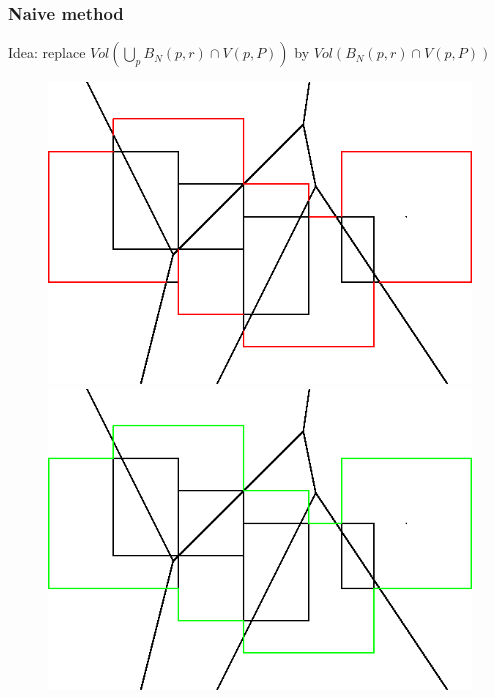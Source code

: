 \documentclass{beamer}
\begin{document}
\begin{frame}
    \frametitle{Naive method}

    Idea: replace $ Vol(\bigcup_p B_N(p, r) \cap V(p, P)) $ by $ Vol(B_N(p, r) \cap V(p, P)) $

    \begin{figure}
        \centering
        \includegraphics[scale=0.5]{img/3d_perimeter_squares}
        \hspace{2cm}
        \includegraphics[scale=0.5]{img/3d_perimeter_squares_truth}
    \end{figure}


\end{frame}
\end{document}
